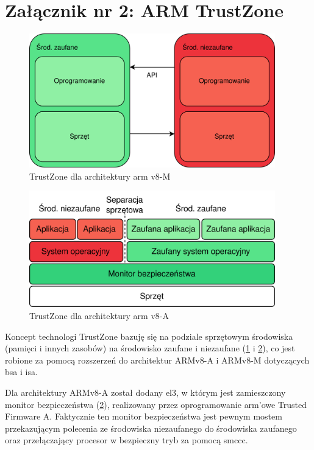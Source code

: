 \documentclass[../main]{subfiles}
\begin{document}
\section*{Załącznik nr 2: ARM TrustZone}\label{sec:zalacznik-2}
\begin{figure}
    \centering
    \includegraphics[width=0.95\textwidth]{Images/trustzone-m.png}
    \caption{TrustZone dla architektury \acrshort{arm} v8-M}
    \label{fig:trustzone-m}
\end{figure}
\begin{figure}
    \centering
    \includegraphics[width=0.95\textwidth]{Images/trustzone-a.png}
    \caption{TrustZone dla architektury \acrshort{arm} v8-A}
    \label{fig:trustzone-a}
\end{figure}

Koncept technologi TrustZone bazuję się na podziale sprzętowym środowiska (pamięci i innych zasobów) na
środowisko zaufane i niezaufane (\cref{fig:trustzone-m} i
\cref{fig:trustzone-a}), co jest robione za pomocą rozszerzeń do architektur ARMv8-A i
ARMv8-M dotyczących \acrshort{bsa} i \acrshort{isa}.

Dla architektury ARMv8-A został dodany \acrshort{el}3, w którym jest zamieszczony monitor bezpieczeństwa
(\cref{fig:trustzone-a}), realizowany przez oprogramowanie \acrshort{arm}'owe Trusted
Firmware A. Faktycznie ten monitor bezpieczeństwa jest pewnym mostem przekazującym polecenia ze
środowiska niezaufanego do środowiska zaufanego oraz przełączający procesor w bezpieczny tryb za pomocą
\acrshort{smccc}. \cite{smccc}\cite{trustzoneaarch64} %
\end{document}

